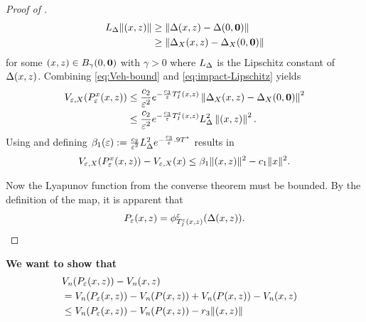 \documentclass[twocolumn]{article}
\begin{document}
\begin{proof} [Proof of ]
  \begin{align}
    \label{eq:impact-Lipschitz}
    L_{\Delta} \| (x, z) \| &\geq \| \Delta(x, z) - \Delta(0, {\mathbf 0}) \|\\
    \nonumber
    &\geq \| \Delta_{X}(x, z) - \Delta_{X}(0, {\mathbf 0}) \|
  \end{align}
  for some $(x, z) \in B_{\gamma}(0, {\mathbf 0})$ with $\gamma > 0$ where $L_{\Delta}$ is the Lipschitz constant of $\Delta(x, z)$.
  Combining \eqref{eq:Veh-bound} and \eqref{eq:impact-Lipschitz} yields
  \begin{align}
    \nonumber
    V_{\varepsilon, X}(P_{\varepsilon}^{x}(x, z)) &\leq \frac{c_{2}}{\varepsilon^{2}} e^{-\frac{c_{3}}{\varepsilon} T_{I}^{\varepsilon}(x, z)} \left\| \Delta_{X}(x, z) - \Delta_{X}(0, {\mathbf 0}) \right\|^{2}\\
    &\leq \frac{c_{2}}{\varepsilon^{2}} e^{-\frac{c_{3}}{\varepsilon} T_{I}^{\varepsilon}(x, z)} L_{\Delta}^{2} \left\| (x, z) \right\|^{2}.
  \end{align}
  Using  and defining $\beta_{1}(\varepsilon) := \frac{c_{2}}{\varepsilon^{2}} L_{\Delta}^{2} e^{-\frac{c_{3}}{\varepsilon} .9 T^{*}}$ results in
  \begin{align}
    V_{\varepsilon, X}(P_{\varepsilon}^{x}(x, z)) - V_{\varepsilon, X}(x) \leq \beta_{1} \| (x, z) \|^{2} - c_{1} \| x \|^{2}.
  \end{align}

  Now the Lyapunov function from the converse theorem must be bounded.
  By the definition of the \Poincare{} map, it is apparent that
  \begin{align}
    P_{\varepsilon}(x, z) = \phi^{\varepsilon}_{T_{I}^{\varepsilon}(x, z)}(\Delta(x, z)).
  \end{align}
\end{proof}

{\bf We want to show that}
\begin{align}
  \lefteqn{\Vn(\Pe\argsxz) - \Vn\argsxz }\\
  \nonumber
  &= \Vn(\Pe\argsxz) - \Vn(\P\argsxz) + \Vn(\P\argsxz) - \Vn\argsxz\\
  \nonumber
  &\leq \Vn(\Pe\argsxz) - \Vn(\P\argsxz) - r_{3} \|\argsxz\|
\end{align}
\end{document}
